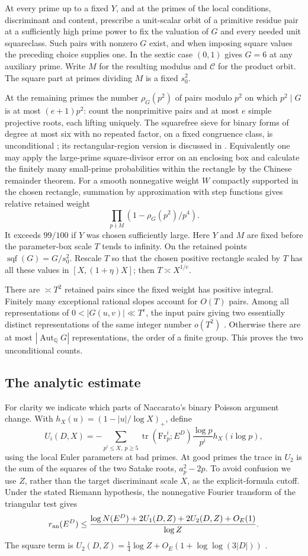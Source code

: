 \documentclass[11pt]{article}
\newcommand{\Q}{\mathbb Q}\newcommand{\F}{\mathbb F}\newcommand{\Z}{\mathbb Z}
\begin{document}
At every prime up to a fixed $Y$, and at the primes of the local conditions, discriminant and content, prescribe a unit-scalar orbit of a primitive residue pair at a sufficiently high prime power to fix the valuation of $G$ and every needed unit squareclass. Such pairs with nonzero $G$ exist, and when imposing square values the preceding choice supplies one. In the sextic case $(0,1)$ gives $G=6$ at any auxiliary prime. Write $M$ for the resulting modulus and $\mathcal C$ for the product orbit. The square part at primes dividing $M$ is a fixed $s_0^2$.

At the remaining primes the number $\rho_G(p^2)$ of pairs modulo $p^2$ on which $p^2\mid G$ is at most $(e+1)p^2$: count the nonprimitive pairs and at most $e$ simple projective roots, each lifting uniquely. The squarefree sieve for binary forms of degree at most six with no repeated factor, on a fixed congruence class, is unconditional \cite[Thm.~5.3]{varilly}; its rectangular-region version is discussed in \cite[Prop.~1.1]{manduchi}. Equivalently one may apply the large-prime square-divisor error on an enclosing box and calculate the finitely many small-prime probabilities within the rectangle by the Chinese remainder theorem. For a smooth nonnegative weight $W$ compactly supported in the chosen rectangle, summation by approximation with step functions gives relative retained weight
\[
                 \prod_{p\nmid M}(1-\rho_G(p^2)/p^4).
\]
It exceeds $99/100$ if $Y$ was chosen sufficiently large. Here $Y$ and $M$ are fixed before the parameter-box scale $T$ tends to infinity. On the retained points $\operatorname{sqf}(G)=G/s_0^2$. Rescale $T$ so that the chosen positive rectangle scaled by $T$ has all these values in $[X,(1+\eta)X]$; then $T\asymp X^{1/e}$.

There are $\asymp T^2$ retained pairs since the fixed weight has positive integral. Finitely many exceptional rational slopes account for $O(T)$ pairs. Among all representations of $0<|G(u,v)|\ll T^e$, the input pairs giving two essentially distinct representations of the same integer number $o(T^2)$ \cite[Lemma~2.4]{stewart}. Otherwise there are at most $|\operatorname{Aut}_{\Q}G|$ representations, the order of a finite group. This proves the two unconditional counts.

\subsection{The analytic estimate}
For clarity we indicate which parts of Naccarato's binary Poisson argument \cite[\S4]{nacc} change. With $h_X(u)=(1-|u|/\log X)_+$, define
\[
 U_i(D,X)=-\sum_{p^i\le X,\ p\ge5}
  \operatorname{tr}(\mathrm{Fr}_p^i;E^D)\frac{\log p}{p^i}h_X(i\log p),
\]
using the local Euler parameters at bad primes. At good primes the trace in $U_2$ is the sum of the squares of the two Satake roots, $a_p^2-2p$. To avoid confusion we use $Z$, rather than the target discriminant scale $X$, as the explicit-formula cutoff. Under the stated Riemann hypothesis, the nonnegative Fourier transform of the triangular test gives
\[
 r_{\rm an}(E^D)\le
 \frac{\log N(E^D)+2U_1(D,Z)+2U_2(D,Z)+O_E(1)}{\log Z}.
\]
The square term is $U_2(D,Z)=\tfrac14\log Z+O_E(1+\log\log(3|D|))$ \cite[Lemma~3.5]{nacc}.
\end{document}
